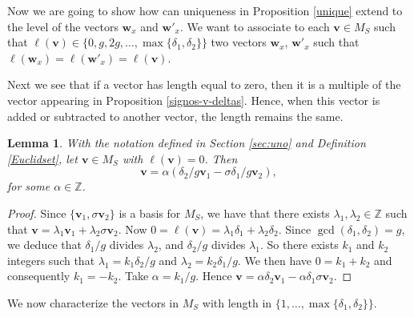 \documentclass[11pt]{amsart}
\newtheorem{lemma}[theorem]{Lemma}
\theoremstyle{remark}
\begin{document}
Now we are going to show how can uniqueness in Proposition \ref{unique} extend to the level of the vectors $\mathbf w_x$ and $\mathbf w'_x$. We want to associate to each $\mathbf v \in M_S$  such that $\ell(\mathbf v)\in\{0,g,2g,\ldots, \max\{\delta_1,\delta_2\}\}$ two vectors $\mathbf w_x$, $\mathbf w'_x$ such that $\ell(\mathbf w_x)=\ell(\mathbf w'_x)=\ell(\mathbf v)$.

Next we see that if a vector has length equal to zero, then it is a multiple of the vector appearing in Proposition \ref{signos-v-deltas}. Hence, when this vector is added or subtracted to another vector, the length remains the same.

\begin{lemma}
With the notation defined in Section \ref{sec:uno} and Definition \ref{Euclidset}, let $\mathbf v\in M_S$ with $\ell(\mathbf v)=0$. Then 
\[
\mathbf v=\alpha(\delta_2/g\mathbf v_1-\sigma\delta_1/g\mathbf v_2),
\]
for some $\alpha\in \mathbb Z$. 
\end{lemma}
\begin{proof}
Since $\{\mathbf v_1, \sigma\mathbf v_2\}$ is a basis for $M_S$, we have that there exists $\lambda_1,\lambda_2\in \mathbb Z$ such that $\mathbf v=\lambda_1\mathbf v_1+\lambda_2\sigma\mathbf v_2$. Now $0=\ell(\mathbf v)=\lambda_1\delta_1+\lambda_2\delta_2$. Since $\gcd(\delta_1,\delta_2)=g$, we deduce that $\delta_1/g$ divides $\lambda_2$, and $\delta_2/g$ divides $\lambda_1$. So there exists $k_1$ and $k_2$ integers such that $\lambda_1=k_1\delta_2/g$ and $\lambda_2=k_2\delta_1/g$. We then have $0=k_1+k_2$ and consequently $k_1=-k_2$. Take $\alpha=k_1/g$. Hence $\mathbf v=\alpha\delta_2 \mathbf v_1 - \alpha \delta_1 \sigma\mathbf v_2$. 
\end{proof}

We now characterize the vectors in $M_S$ with length in $\{1,\ldots, \max\{\delta_1,\delta_2\}\}$.
\end{document}
